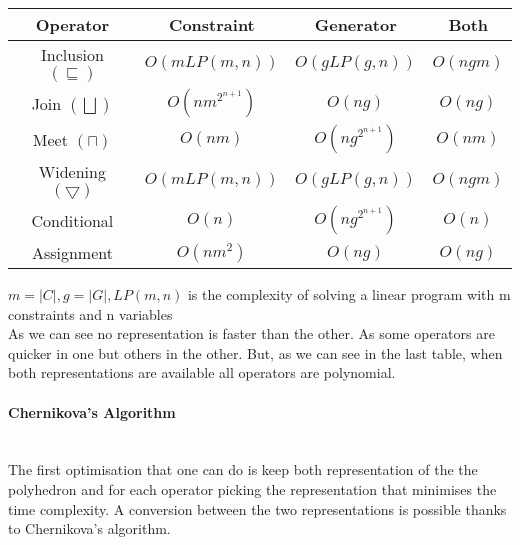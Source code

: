 \begin{center}
\begin{tabular}{||c c c c||} 
 
 \hline
 Operator & Constraint & Generator & Both \\ [0.5ex] 
 \hline
 Inclusion $(\sqsubseteq)$ & $O(mLP(m,n))$ & $O(gLP(g,n))$ & $O(ngm)$ \\ 
 \hline
 Join $(\bigsqcup)$ & $O(nm^{2^{n+1}})$ & $O(ng)$ & $O(ng)$ \\
 \hline
 Meet $(\sqcap)$ & $O(nm)$ & $O(ng^{2^{n+1}})$ & $O(nm)$\\
 \hline
 Widening $(\bigtriangledown)$ & $O(mLP(m,n))$ & $O(gLP(g,n))$ & $O(ngm)$ \\
 \hline
 Conditional & $O(n)$ & $O(ng^{2^{n+1}})$ & $O(n)$ \\ 
 \hline
 Assignment & $O(nm^2)$ & $O(ng)$ & $O(ng)$ \\ 
 
 
 \hline
\end{tabular}
\end{center}
$m=|C|,g=|G|,LP(m,n)$ is the complexity of solving a linear program with m constraints and n variables\\
As we can see no representation is faster than the other. As some operators are quicker in one but others in the other. But, as we can see in the last table, when both representations are available all operators are polynomial.\\
\paragraph{Chernikova's Algorithm} \mbox{}\\
 The first optimisation that one can do is keep both representation of the the polyhedron and for each operator picking the representation that minimises the time complexity. A conversion between the two representations is possible thanks to Chernikova's algorithm\cite{chernikova1968algorithm}. 
 
